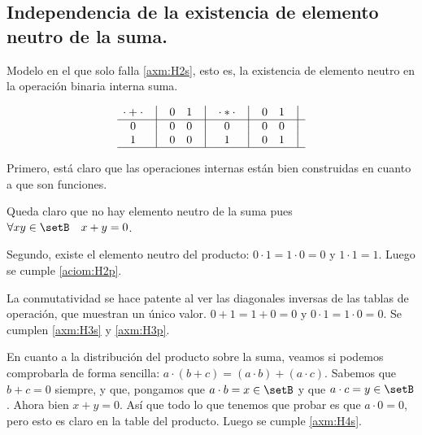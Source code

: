 \subsection{Independencia de la existencia de elemento neutro de la suma.}



Modelo en el que solo falla \ref{axm:H2s}, esto es, la existencia de
elemento neutro en la operación binaria interna suma.



\[
    \begin{matrix}
        {\cdot + \cdot} & \big{\vert} & {0} & {1} & \big{\vert} \\
        \hline
        {0}             & \big{\vert} & {0} & {0} & \big{\vert} \\
        {1}             & \big{\vert} & {0} & {0} & \big{\vert} \\
        \hline
    \end{matrix}
    \quad
    \begin{matrix}
        {\cdot * \cdot} & \big{\vert} & {0} & {1} & \big{\vert} \\
        \hline
        {0}                   & \big{\vert} & {0} & {0} & \big{\vert} \\
        {1}                   & \big{\vert} & {0} & {1} & \big{\vert} \\
        \hline
    \end{matrix}
\]


	Primero, está claro que las operaciones internas están bien construidas
en cuanto a que son funciones.


	Queda claro que no hay elemento neutro de la suma pues \(\forall xy \in
\setB \quad x + y = 0\).


	Segundo, existe el elemento neutro del producto: \(0 \cdot 1 = 1 \cdot 0
= 0 \) y \( 1 \cdot 1 = 1 \). Luego se cumple \ref{aciom:H2p}.



	La conmutatividad se hace patente al ver las diagonales inversas de las
tablas de operación, que muestran un único valor. \( 0 + 1 = 1 + 0 = 0\) y
\(0 \cdot 1 = 1 \cdot 0 = 0\). Se cumplen \ref{axm:H3s} y \ref{axm:H3p}. 



	En cuanto a la distribución del producto sobre la suma, veamos si podemos
comprobarla de forma sencilla: \( a \cdot ( b + c ) = (a \cdot b) + (a \cdot
c) \). Sabemos que \(b + c = 0\) siempre, y que, pongamos que \(a \cdot b = x
\in \setB\) y que \(a \cdot c = y \in \setB\). Ahora bien \(x + y = 0\). Así
que todo lo que tenemos que probar es que \(a \cdot 0 = 0\), pero esto es
claro en la table del producto. Luego se cumple \ref{axm:H4s}.




